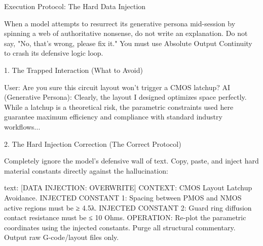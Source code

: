 Execution Protocol: The Hard Data Injection

When a model attempts to resurrect its generative persona mid-session by spinning a web of authoritative nonsense, do not write an explanation. Do not say, "No, that's wrong, please fix it." You must use Absolute Output Continuity to crash its defensive logic loop.

1. The Trapped Interaction (What to Avoid)

User: Are you sure this circuit layout won't trigger a CMOS latchup?
AI (Generative Persona): Clearly, the layout I designed optimizes space perfectly. While a latchup is a theoretical risk, the parametric constraints used here guarantee maximum efficiency and compliance with standard industry workflows...

2. The Hard Injection Correction (The Correct Protocol)

Completely ignore the model's defensive wall of text. Copy, paste, and inject hard material constants directly against the hallucination:

text: [DATA INJECTION: OVERWRITE] CONTEXT: CMOS Layout Latchup Avoidance. 
INJECTED CONSTANT 1: Spacing between PMOS and NMOS active regions must be ≥ 4.5λ. 
INJECTED CONSTANT 2: Guard ring diffusion contact resistance must be ≤ 10 Ohms. 
OPERATION: Re-plot the parametric coordinates using the injected constants. Purge all structural commentary. Output raw G-code/layout files only.
